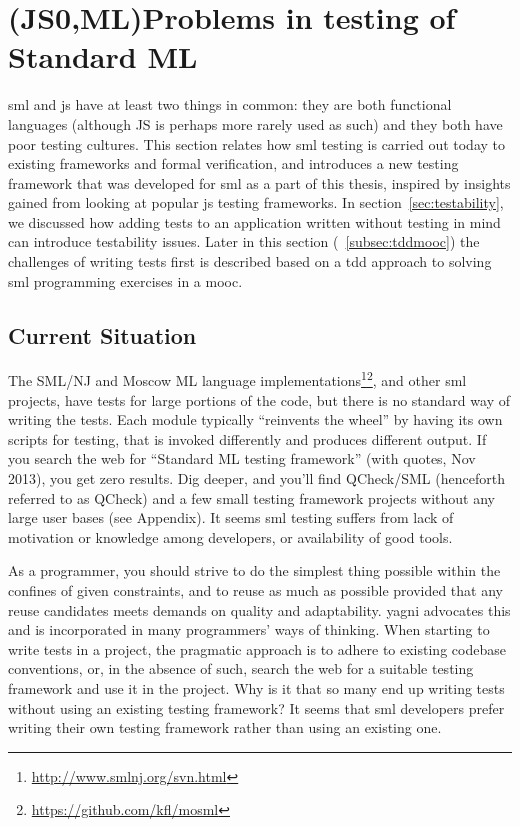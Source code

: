\documentclass[11pt]{article}
\begin{document}
\section{(JS0,ML)Problems in testing of Standard ML}
\label{sec:smlproblems}

\Gls{sml} and \gls{js} have at least two things in common: they are both functional languages (although JS is perhaps more rarely used as such) and they both have poor testing cultures. This section relates how \gls{sml} testing is carried out today to existing frameworks and formal verification, and introduces a new testing framework that was developed for \gls{sml} as a part of this thesis, inspired by insights gained from looking at popular \gls{js} testing frameworks. In section~\ref{sec:testability}, we discussed how adding tests to an application written without testing in mind can introduce testability issues. Later in this section (~\ref{subsec:tddmooc}) the challenges of writing tests first is described based on a \gls{tdd} approach to solving \gls{sml} programming exercises in a \gls{mooc}.

\subsection{Current Situation}

The SML/NJ and Moscow ML language implementations\footnote{\url{http://www.smlnj.org/svn.html}}\footnote{\url{https://github.com/kfl/mosml}}, and other \gls{sml} projects, have tests for large portions of the code, but there is no standard way of writing the tests. Each module typically ``reinvents the wheel'' by having its own scripts for testing, that is invoked differently and produces different output. If you search the web for ``Standard ML testing framework'' (with quotes, Nov 2013), you get zero results. Dig deeper, and you'll find QCheck/SML (henceforth referred to as QCheck) and a few small testing framework projects without any large user bases (see Appendix). It seems \gls{sml} testing suffers from lack of motivation or knowledge among developers, or availability of good tools. %

As a programmer, you should strive to do the simplest thing possible within the confines of given constraints, and to reuse as much as possible provided that any reuse candidates meets demands on quality and adaptability. \Gls{yagni} advocates this and is incorporated in many programmers' ways of thinking. When starting to write tests in a project, the pragmatic approach is to adhere to existing codebase conventions, or, in the absence of such, search the web for a suitable testing framework and use it in the project. Why is it that so many end up writing tests without using an existing testing framework? It seems that \gls{sml} developers prefer writing their own testing framework rather than using an existing one.
\end{document}
